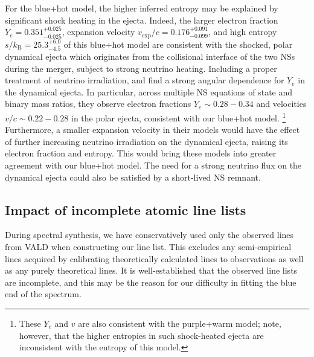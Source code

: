 \documentclass[twocolumn, twocolappendix]{aastex63}
\begin{document}
For the blue+hot model, the higher inferred entropy may be explained by significant shock heating in the ejecta. Indeed, the larger electron fraction $Y_e = 0.351^{+0.025}_{-0.025}$, expansion velocity $v_{\mathrm{exp}}/c = 0.176^{+0.091}_{-0.099}$, and high entropy $s/k_{\mathrm{B}} = 25.3^{+6.0}_{-4.5}$ of this blue+hot model are consistent with the shocked, polar dynamical ejecta which originates from the collisional interface of the two NSs during the merger, subject to strong neutrino heating. Including a proper treatment of neutrino irradiation, \cite{kullmann22a} and \cite{just22} find a strong angular dependence for $Y_e$ in the dynamical ejecta. In particular, across multiple NS equations of state and binary mass ratios, they observe electron fractions $Y_e \sim 0.28 - 0.34$ and velocities $v/c \sim 0.22 - 0.28$ in the polar ejecta, consistent with our blue+hot model. \footnote{These $Y_e$ and $v$ are also consistent with the purple+warm model; note, however, that the higher entropies in such shock-heated ejecta are inconsistent with the entropy of this model.} Furthermore, a smaller expansion velocity in their models would have the effect of further increasing neutrino irradiation on the dynamical ejecta, raising its electron fraction and entropy. This would bring these models into greater agreement with our blue+hot model. The need for a strong neutrino flux on the dynamical ejecta could also be satisfied by a short-lived NS remnant.


\subsection{Impact of incomplete atomic line lists}\label{ssc:incomplete_lines}

During spectral synthesis, we have conservatively used only the observed lines from VALD when constructing our line list. This excludes any semi-empirical lines acquired by calibrating theoretically calculated lines to observations as well as any purely theoretical lines. It is well-established that the observed line lists are incomplete, and this may be the reason for our difficulty in fitting the blue end of the spectrum.   
\end{document}
